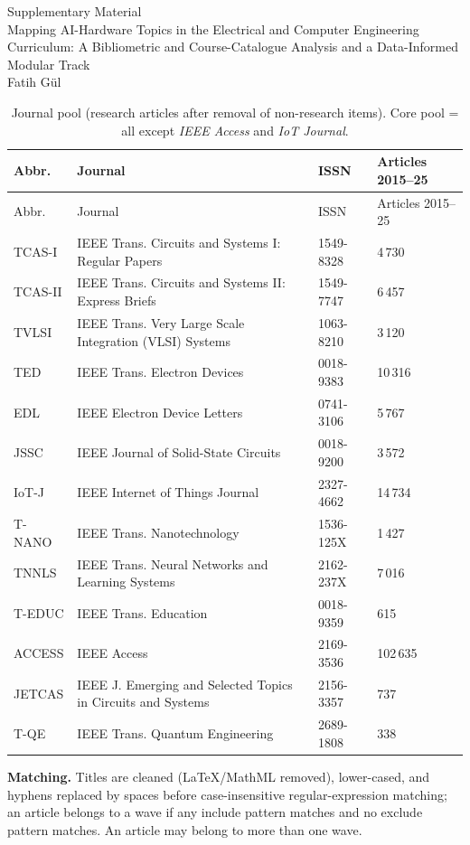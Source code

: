 \documentclass[10pt]{article}
\begin{document}
\begin{center}{\Large Supplementary Material}\\[4pt]
Mapping AI-Hardware Topics in the Electrical and Computer Engineering Curriculum:
A Bibliometric and Course-Catalogue Analysis and a Data-Informed Modular Track\\[2pt]
Fatih G\"ul\end{center}
\footnotesize
\begin{longtable}{@{}llll@{}}
\caption{Journal pool (research articles after removal of non-research items). Core pool = all except \emph{IEEE Access} and \emph{IoT Journal}.}\label{tab:S1}\\
\toprule
Abbr. & Journal & ISSN & Articles 2015--25 \\
\midrule
\endfirsthead
\toprule
Abbr. & Journal & ISSN & Articles 2015--25 \\
\midrule
\endhead
\bottomrule
\endlastfoot
TCAS-I & IEEE Trans. Circuits and Systems I: Regular Papers & 1549-8328 & 4\,730 \\
TCAS-II & IEEE Trans. Circuits and Systems II: Express Briefs & 1549-7747 & 6\,457 \\
TVLSI & IEEE Trans. Very Large Scale Integration (VLSI) Systems & 1063-8210 & 3\,120 \\
TED & IEEE Trans. Electron Devices & 0018-9383 & 10\,316 \\
EDL & IEEE Electron Device Letters & 0741-3106 & 5\,767 \\
JSSC & IEEE Journal of Solid-State Circuits & 0018-9200 & 3\,572 \\
IoT-J & IEEE Internet of Things Journal & 2327-4662 & 14\,734 \\
T-NANO & IEEE Trans. Nanotechnology & 1536-125X & 1\,427 \\
TNNLS & IEEE Trans. Neural Networks and Learning Systems & 2162-237X & 7\,016 \\
T-EDUC & IEEE Trans. Education & 0018-9359 & 615 \\
ACCESS & IEEE Access & 2169-3536 & 102\,635 \\
JETCAS & IEEE J. Emerging and Selected Topics in Circuits and Systems & 2156-3357 & 737 \\
T-QE & IEEE Trans. Quantum Engineering & 2689-1808 & 338 \\
\end{longtable}

\noindent\textbf{Matching.} Titles are cleaned (LaTeX/MathML removed), lower-cased, and hyphens replaced by spaces before case-insensitive regular-expression matching; an article belongs to a wave if any include pattern matches and no exclude pattern matches. An article may belong to more than one wave.
\end{document}
